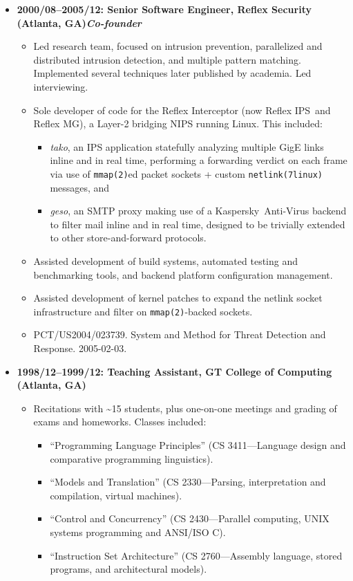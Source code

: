\documentclass{article}
\newenvironment{tightitemize}
{\begin{itemize}
  \setlength{\itemsep}{1pt}
  \setlength{\parskip}{0pt}
  \setlength{\parsep}{0pt}}
{\end{itemize}}
\begin{document}
\begin{tightitemize}
\item \textbf{2000/08--2005/12: Senior Software Engineer, Reflex Security (Atlanta, GA)\hfill \tiny{\textit{Co-founder}}}
\begin{tightitemize}
\item Led research team, focused on intrusion prevention, parallelized and
  distributed intrusion detection, and multiple pattern matching. Implemented
  several techniques later published by academia. Led interviewing.
\item Sole developer of code for the Reflex Interceptor (now Reflex IPS\texttrademark\ and
  Reflex MG\texttrademark), a Layer-2 bridging NIPS running Linux. This included:
\begin{tightitemize}
    \item \textit{tako}, an IPS application statefully analyzing multiple GigE links inline
      and in real time, performing a forwarding verdict on each frame via use
      of \texttt{mmap(2)}ed packet sockets + custom \texttt{netlink(7linux)} messages, and
    \item \textit{geso}, an SMTP proxy making use of a Kaspersky\texttrademark\ Anti-Virus backend to
      filter mail inline and in real time, designed to be trivially extended
      to other store-and-forward protocols.
\end{tightitemize}
\item Assisted development of build systems, automated testing and benchmarking tools, and backend
      platform configuration management.
\item Assisted development of kernel patches to expand the netlink socket
      infrastructure and filter on \texttt{mmap(2)}-backed sockets.
\item PCT/US2004/023739. System and Method for Threat Detection and Response. 2005-02-03.\hfill {}\\
\end{tightitemize}

\item \textbf{1998/12--1999/12: Teaching Assistant, GT College of Computing (Atlanta, GA)}
\begin{tightitemize}
\item Recitations with \textasciitilde15 students, plus one-on-one meetings and grading of exams
and homeworks. Classes included:
\begin{tightitemize}
\item ``Programming Language Principles'' (CS 3411---Language design and comparative programming linguistics).
\item ``Models and Translation'' (CS 2330---Parsing, interpretation and compilation, virtual machines).
\item ``Control and Concurrency'' (CS 2430---Parallel computing, UNIX systems programming and ANSI/ISO C).
\item ``Instruction Set Architecture'' (CS 2760---Assembly language, stored programs, and architectural models).\\
\end{tightitemize}
\end{tightitemize}


\end{tightitemize}
\end{document}
